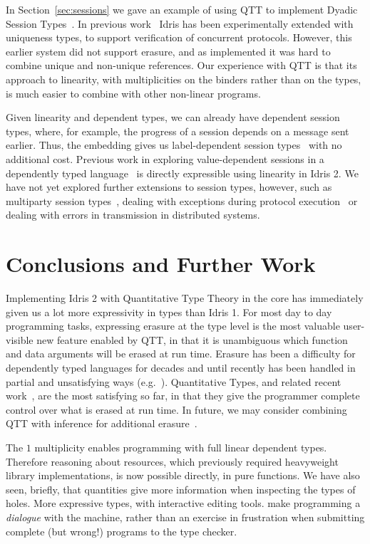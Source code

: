 In Section~\ref{sec:sessions} we gave an example of using QTT
to implement Dyadic Session Types~\cite{Honda1993}. In previous 
work~\cite{brady-lambda2017} Idris has been experimentally extended with
uniqueness types, to support verification of concurrent protocols. However,
this earlier system did not support erasure, and as implemented it was hard
to combine unique and non-unique references. Our experience with QTT is that
its approach to linearity, with multiplicities on the binders rather than on
the types, is much easier to combine with other non-linear programs.

Given linearity and dependent types, we can already have dependent session
types, where, for example, the progress of a session depends on a message
sent earlier. Thus, the embedding gives us label-dependent session
types~\cite{labelst} with no additional cost. Previous work in exploring value-dependent
sessions in a dependently typed language~\cite{janplaces2019} is directly
expressible using linearity in Idris 2.  
We have not yet explored further extensions to
session types, however, such as multiparty session types~\cite{Honda2008},
dealing with exceptions during protocol execution~\cite{Fowler2019} or
dealing with errors in transmission in distributed systems.


\section{Conclusions and Further Work}

Implementing Idris 2 with Quantitative Type Theory in the core has immediately
given us a lot more expressivity in types than Idris 1.  For most day to day
programming tasks, expressing erasure at the type level is the most valuable
user-visible new feature enabled by QTT, in that it is unambiguous which
function and data arguments will be erased at run time.  Erasure has been a
difficulty for dependently typed languages for decades and until recently has been
handled in partial and unsatisfying ways (e.g.~\cite{brady_inductive_2003}).
Quantitative Types, and related recent work~\cite{matus-draft}, are the most
satisfying so far, in that they give the programmer complete control over what
is erased at run time. In future, we may consider combining QTT with inference
for additional erasure~\cite{matus-draft}.

The $1$ multiplicity enables programming with full linear dependent types.
Therefore reasoning about resources, which previously required heavyweight
library implementations, is now possible directly, in pure functions. We have
also seen, briefly, that quantities give more information when inspecting the
types of holes. More expressive types, with interactive editing tools.  make
programming a \emph{dialogue} with the machine, rather than an exercise in
frustration when submitting complete (but wrong!) programs to the type checker.

